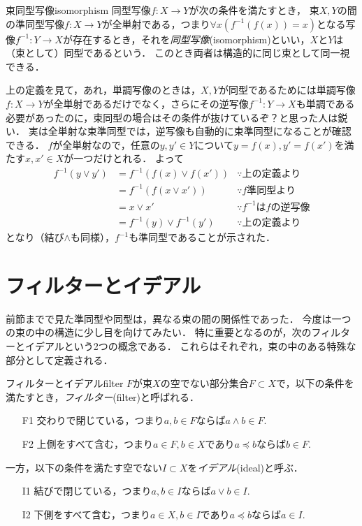 \documentclass[11pt,a4paper, dvipdfmx]{jsarticle}
\begin{document}
\begin{dfn}{束同型写像}{isomorphism}
同型写像$f:X \to Y$が次の条件を満たすとき，
束$X, Y$の間の準同型写像$f:X \to Y$が全単射である，つまり$\forall x (f^{-1}(f(x))=x)$となる写像$f^{-1}:Y \to X$が存在するとき，それを\emph{同型写像}(isomorphism)といい，$X$と$Y$は（束として）同型であるという．
このとき両者は構造的に同じ束として同一視できる．
\end{dfn}

\begin{attn}
上の定義を見て，あれ，単調写像のときは，$X,Y$が同型であるためには単調写像$f: X \to Y$が全単射であるだけでなく，さらにその逆写像$f^{-1}: Y \to X$も単調である必要があったのに，束同型の場合はその条件が抜けているぞ？と思った人は鋭い．
実は全単射な束準同型では，逆写像も自動的に束準同型になることが確認できる．
$f$が全単射なので，任意の$y, y' \in Y$について$y = f(x), y'=f(x')$を満たす$x, x' \in X$が一つだけとれる．
よって
\begin{align*}
    f^{-1}(y \vee y') 
    &= f^{-1}(f(x) \vee f(x')) & \because \text{上の定義より}\\
    &= f^{-1}(f(x \vee x')) & \because f \text{準同型より} \\
    &= x \vee x' & \because f^{-1} \text{は} f \text{の逆写像} \\
    &= f^{-1}(y) \vee f^{-1}(y') & \because \text{上の定義より}
\end{align*}
となり（結び$\wedge$も同様），$f^{-1}$も準同型であることが示された．
\end{attn}






\section{フィルターとイデアル}
前節までで見た準同型や同型は，異なる束の間の関係性であった．
今度は一つの束の中の構造に少し目を向けてみたい．
特に重要となるのが，次のフィルターとイデアルという2つの概念である．
これらはそれぞれ，束の中のある特殊な部分として定義される．
\begin{dfn}{フィルターとイデアル}{filter}
$F$が束$X$の空でない部分集合$F \subset X$で，以下の条件を満たすとき，\emph{フィルター}(filter)と呼ばれる．
\begin{enumerate}
    \item[F1] 交わりで閉じている，つまり$a, b \in F$ならば$a \wedge b \in F$.
    \item[F2] 上側をすべて含む，つまり$a \in F, b \in X$であり$a \preceq b$ならば$b \in F$.
\end{enumerate}
一方，以下の条件を満たす空でない$I \subset X$を\emph{イデアル}(ideal)と呼ぶ．
\begin{enumerate}
    \item[I1] 結びで閉じている，つまり$a, b \in I$ならば$a \vee b \in I$.
    \item[I2] 下側をすべて含む，つまり$a \in X, b \in I$であり$a \preceq b$ならば$a \in I$.
\end{enumerate}
\end{dfn}
\end{document}
